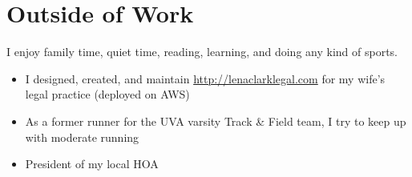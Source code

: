 \documentclass[12pt]{article}
\begin{document}

\section*{Outside of Work}

I enjoy family time, quiet time, reading, learning, and doing any kind of
sports.

\begin{itemize}
\item I designed, created, and maintain \url{http://lenaclarklegal.com} for my
  wife's legal practice (deployed on AWS)
\item As a former runner for the UVA varsity Track \& Field team, I try to
  keep up with moderate running
\item President of my local HOA
\end{itemize}
\end{document}
